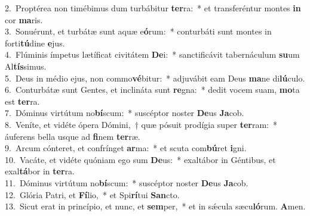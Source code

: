 {2.~}Proptérea non timébimus dum turbábitur \textbf{ter}ra:~* et transferéntur montes \textbf{in} cor \textbf{ma}ris.\\
{3.~}Sonuérunt, et turbátæ sunt aquæ e\textbf{ó}rum:~* conturbáti sunt montes in forti\textbf{tú}dine \textbf{e}jus.\\
{4.~}Flúminis ímpetus lætíficat civitátem \textbf{De}i:~* sanctificávit tabernáculum \textbf{su}um Al\textbf{tís}simus.\\
{5.~}Deus in médio ejus, non commo\textbf{vé}bitur:~* adjuvábit eam Deus \textbf{ma}ne di\textbf{lú}culo.\\
{6.~}Conturbátæ sunt Gentes, et inclináta sunt \textbf{re}gna:~* dedit vocem suam, \textbf{mo}ta est \textbf{ter}ra.\\
{7.~}Dóminus virtútum no\textbf{bí}scum:~* suscéptor noster \textbf{De}us \textbf{Ja}cob.\\
{8.~}Veníte, et vidéte ópera Dómini,~† quæ pósuit prodígia super \textbf{ter}ram:~* áuferens bella usque ad \textbf{fi}nem \textbf{ter}ræ.\\
{9.~}Arcum cónteret, et confrínget \textbf{ar}ma:~* et scuta com\textbf{bú}ret \textbf{i}gni.\\
{10.~}Vacáte, et vidéte quóniam ego sum \textbf{De}us:~* exaltábor in Géntibus, et exal\textbf{tá}bor in \textbf{ter}ra.\\
{11.~}Dóminus virtútum no\textbf{bí}scum:~* suscéptor noster \textbf{De}us \textbf{Ja}cob.\\
{12.~}Glória Patri, et \textbf{Fí}lio,~* et Spi\textbf{rí}tui \textbf{San}cto.\\
{13.~}Sicut erat in princípio, et nunc, et \textbf{sem}per,~* et in sǽcula sæcu\textbf{ló}rum. \textbf{A}men.\\
